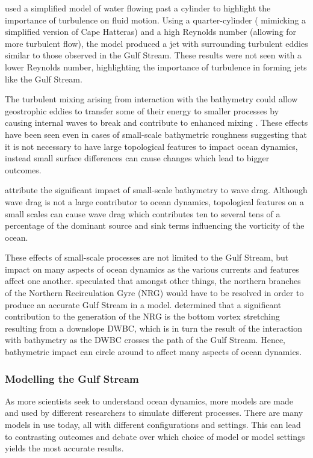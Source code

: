 \documentclass[a4paper,11pt]{article}
\begin{document}
\citep{Tansley2001} used a simplified model of water flowing past a cylinder to highlight the importance of turbulence on fluid motion. Using a quarter-cylinder ( mimicking a simplified version of Cape Hatteras) and a high Reynolds number (allowing for more turbulent flow), the model produced a jet with surrounding turbulent eddies similar to those observed in the Gulf Stream. These results were not seen with a lower Reynolds number, highlighting the importance of turbulence in forming jets like the Gulf Stream.

The turbulent mixing arising from interaction with the bathymetry could allow geostrophic eddies to transfer some of their energy to smaller processes by causing internal waves to break and contribute to enhanced mixing \citep{Nikurashin2012a}. These effects have been seen even in cases of small-scale bathymetric roughness suggesting that it is not necessary to have large topological features to impact ocean dynamics, instead small surface differences can cause changes which lead to bigger outcomes.

\citep{NaveiraGarabato2013} attribute the significant impact of small-scale bathymetry to wave drag. Although wave drag is not a large contributor to ocean dynamics, topological features on a small scales can cause wave drag which contributes ten to several tens of a percentage of the dominant source and sink terms influencing the vorticity of the ocean.


These effects of small-scale processes are not limited to the Gulf Stream, but impact on many aspects of ocean dynamics as the various currents and features affect one another. 
\citep{Ezer2016} speculated that amongst other things, the northern branches of the Northern Recirculation Gyre (NRG) would have to be resolved in order to produce an accurate Gulf Stream in a model. \citep{Zhang2007} determined that a significant contribution to the generation of the NRG is the bottom vortex stretching resulting from a downslope DWBC, which is in turn the result of the interaction with bathymetry as the DWBC crosses the path of the Gulf Stream. Hence, bathymetric impact can circle around to affect many aspects of ocean dynamics.


\subsubsection{Modelling the Gulf Stream}

As more scientists seek to understand ocean dynamics, more models are made and used by different researchers to simulate different processes. There are many models in use today, all with different configurations and settings. This can lead to contrasting outcomes and debate over which choice of model or model settings yields the most accurate results.
\end{document}
